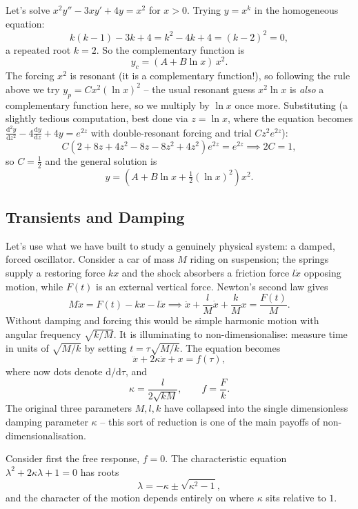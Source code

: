 \documentclass[a4paper]{scrartcl}
\begin{document}
\begin{example}
	Let's solve $x^2 y'' - 3xy' + 4y = x^2$ for $x > 0$. Trying $y = x^k$ in the homogeneous equation:
	$$
	k(k - 1) - 3k + 4 = k^2 - 4k + 4 = (k - 2)^2 = 0,
	$$
	a repeated root $k = 2$. So the complementary function is
	$$
	y_c = (A + B \ln x)\, x^2.
	$$
	The forcing $x^2$ is resonant (it is a complementary function!), so following the rule above we try $y_p = C x^2 (\ln x)^2$ -- the usual resonant guess $x^2 \ln x$ is \emph{also} a complementary function here, so we multiply by $\ln x$ once more. Substituting (a slightly tedious computation, best done via $z = \ln x$, where the equation becomes $\frac{\mathrm{d}^2y}{\mathrm{d}z^2} - 4\frac{\mathrm{d}y}{\mathrm{d}z} + 4y = e^{2z}$ with double-resonant forcing and trial $Cz^2 e^{2z}$):
	$$
	C\left(2 + 8z + 4z^2 - 8z - 8z^2 + 4z^2\right)e^{2z} = e^{2z} \implies 2C = 1,
	$$
	so $C = \frac12$ and the general solution is
	$$
	y = \left(A + B \ln x + \tfrac{1}{2}(\ln x)^2\right) x^2.
	$$
\end{example}

\subsection{Transients and Damping}

Let's use what we have built to study a genuinely physical system: a damped, forced oscillator. Consider a car of mass $M$ riding on suspension; the springs supply a restoring force $kx$ and the shock absorbers a friction force $l \dot x$ opposing motion, while $F(t)$ is an external vertical force. Newton's second law gives
$$
M \ddot x = F(t) - kx - l \dot x \implies \ddot x + \frac{l}{M} \dot x + \frac{k}{M} x = \frac{F(t)}{M}.
$$
Without damping and forcing this would be simple harmonic motion with angular frequency $\sqrt{k/M}$. It is illuminating to non-dimensionalise: measure time in units of $\sqrt{M/k}$ by setting $t = \tau \sqrt{M/k}$. The equation becomes
$$
\ddot x + 2\kappa \dot x + x = f(\tau),
$$
where now dots denote $\mathrm{d}/\mathrm{d}\tau$, and
$$
\kappa = \frac{l}{2\sqrt{kM}}, \qquad f = \frac{F}{k}.
$$
The original three parameters $M, l, k$ have collapsed into the single dimensionless damping parameter $\kappa$ -- this sort of reduction is one of the main payoffs of non-dimensionalisation.

Consider first the free response, $f = 0$. The characteristic equation $\lambda^2 + 2\kappa \lambda + 1 = 0$ has roots
$$
\lambda = -\kappa \pm \sqrt{\kappa^2 - 1},
$$
and the character of the motion depends entirely on where $\kappa$ sits relative to $1$.
\end{document}

